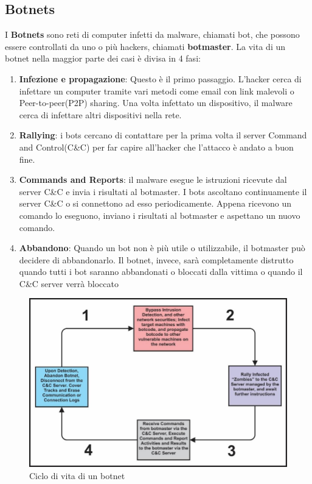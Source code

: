 \documentclass[12pt,a4paper,openright,twoside]{book}
\begin{document}
\subsection{Botnets}
I \textbf{Botnets} sono reti di computer infetti da malware, chiamati bot,
che possono essere controllati da uno o più hackers, chiamati \textbf{botmaster}.
La vita di un botnet nella maggior parte dei casi è divisa in 4 fasi:
\begin{enumerate}
    \item \textbf{Infezione e propagazione}: Questo è il primo
    passaggio. L'hacker cerca di infettare un computer
    tramite vari metodi come email con link malevoli o Peer-to-peer(P2P) sharing.
    Una volta infettato un dispositivo, il malware cerca di infettare
    altri dispositivi nella rete.

    \item \textbf{Rallying}: i bots cercano di contattare per la prima volta
    il server Command and Control(C\&C) per far capire all'hacker
    che l'attacco è andato a buon fine.

    \item \textbf{Commands and Reports}: il malware esegue le istruzioni
    ricevute dal server C\&C e invia i risultati al botmaster.
    I bots ascoltano continuamente il server C\&C 
    o si connettono ad esso periodicamente. Appena ricevono
    un comando lo eseguono, inviano i risultati al botmaster
    e aspettano un nuovo comando.

    \item \textbf{Abbandono}: Quando un bot non è più utile o utilizzabile,
    il botmaster può decidere di abbandonarlo. Il botnet, invece,
    sarà completamente distrutto quando tutti i bot saranno
    abbandonati o bloccati dalla vittima o quando il C\&C server
    verrà bloccato


\end{enumerate}

\begin{figure}[H]
    \centering
    \includegraphics[width=.8\linewidth]{figures/The-Lifecycle-Schema-of-a-typical-Botnet.png}
    \caption{Ciclo di vita di un botnet \cite{Ogu2016}}
    \label{fig:botnet}
\end{figure}
\end{document}
